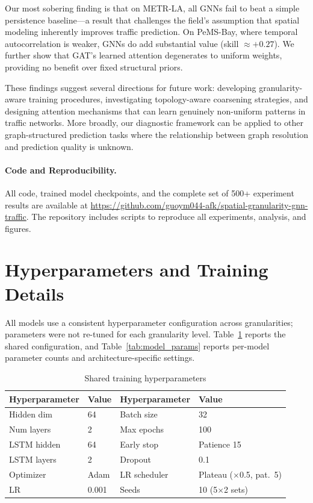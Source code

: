 \documentclass[letterpaper]{article}
\begin{document}
Our most sobering finding is that on METR-LA, all GNNs fail to beat a simple persistence baseline---a result that challenges the field's assumption that spatial modeling inherently improves traffic prediction. On PeMS-Bay, where temporal autocorrelation is weaker, GNNs do add substantial value (skill $\approx +0.27$). We further show that GAT's learned attention degenerates to uniform weights, providing no benefit over fixed structural priors.

These findings suggest several directions for future work: developing granularity-aware training procedures, investigating topology-aware coarsening strategies, and designing attention mechanisms that can learn genuinely non-uniform patterns in traffic networks. More broadly, our diagnostic framework can be applied to other graph-structured prediction tasks where the relationship between graph resolution and prediction quality is unknown.

\paragraph{Code and Reproducibility.}
All code, trained model checkpoints, and the complete set of 500+ experiment results are available at \url{https://github.com/guoym044-afk/spatial-granularity-gnn-traffic}. The repository includes scripts to reproduce all experiments, analysis, and figures.



\appendix

\section{Hyperparameters and Training Details}
\label{app:hyperparams}

All models use a consistent hyperparameter configuration across granularities; parameters were not re-tuned for each granularity level. Table~\ref{tab:hyperparams} reports the shared configuration, and Table~\ref{tab:model_params} reports per-model parameter counts and architecture-specific settings.

\begin{table}[t]
\small
\centering
\caption{Shared training hyperparameters}
\label{tab:hyperparams}
\begin{tabular}{ll|ll}
\toprule
Hyperparameter & Value & Hyperparameter & Value \\
\midrule
Hidden dim & 64 & Batch size & 32 \\
Num layers & 2 & Max epochs & 100 \\
LSTM hidden & 64 & Early stop & Patience 15 \\
LSTM layers & 2 & Dropout & 0.1 \\
Optimizer & Adam & LR scheduler & Plateau ($\times$0.5, pat.\ 5) \\
LR & 0.001 & Seeds & 10 (5$\times$2 sets) \\
\bottomrule
\end{tabular}
\end{table}
\end{document}
